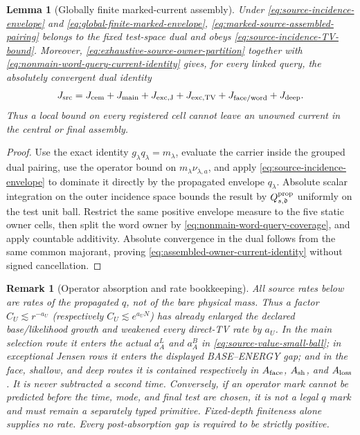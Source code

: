 \documentclass[11pt]{article}
\newtheorem{lemma}[theorem]{Lemma}
\newtheorem{remark}[theorem]{Remark}
\begin{document}
\begin{lemma}[Globally finite marked-current assembly]
\label{lem:globally-finite-marked-current}
Under \eqref{eq:source-incidence-envelope} and
\eqref{eq:global-finite-marked-envelope},
\eqref{eq:marked-source-assembled-pairing} belongs to the fixed test-space
dual and obeys \eqref{eq:source-incidence-TV-bound}.  Moreover,
\eqref{eq:exhaustive-source-owner-partition} together with
\eqref{eq:nonmain-word-query-current-identity} gives, for every linked
query, the absolutely convergent dual identity
\begin{equation}
\label{eq:assembled-owner-current-identity}
 J_{\rm src}=J_{\rm cem}+J_{\rm main}+J_{\rm exc,J}+J_{\rm exc,TV}
              +J_{\rm face/word}+J_{\rm deep}.
\end{equation}
Thus a local bound on every registered cell cannot leave an unowned current
in the central or final assembly.
\end{lemma}

\begin{proof}
Use the exact identity $g_\lambda q_\lambda=m_\lambda$, evaluate the
carrier inside the grouped dual pairing, use the operator bound on
$m_\lambda\nu_{\lambda,a}$, and apply
\eqref{eq:source-incidence-envelope} to dominate it directly by the
propagated envelope $q_\lambda$.  Absolute scalar integration on the outer
incidence space bounds the result by $Q_{s,\mathfrak d}^{\rm prop}$
uniformly on the test unit ball.
Restrict the same positive envelope measure to the five static owner cells,
then split the word owner by
\eqref{eq:nonmain-word-query-coverage},
and apply countable additivity.  Absolute convergence in the dual follows
from the same common majorant, proving
\eqref{eq:assembled-owner-current-identity} without signed cancellation.
\end{proof}

\begin{remark}[Operator absorption and rate bookkeeping]
\label{rem:operator-absorption-rates}
All source rates below are rates of the propagated $q$, not of the bare
physical mass.  Thus a factor $C_U\lesssim r^{-a_U}$ (respectively
$C_U\lesssim e^{a_UN}$) has already enlarged the declared base/likelihood
growth and weakened every direct-TV rate by $a_U$.  In the main selection
route it enters the actual $a_A^L$ and $a_A^B$ in
\eqref{eq:source-value-small-ball}; in exceptional Jensen rows it enters the
displayed BASE--ENERGY gap; and in the face, shallow, and deep routes it is
contained respectively in $A_{\rm face}$, $A_{\rm sh}$, and $A_{\rm loss}$.
It is never subtracted a second time.  Conversely, if an operator mark cannot
be predicted before the time, mode, and final test are chosen, it is not a
legal $q$ mark and must remain a separately typed primitive.  Fixed-depth
finiteness alone supplies no rate.  Every post-absorption gap is required to
be strictly positive.
\end{remark}
\end{document}
